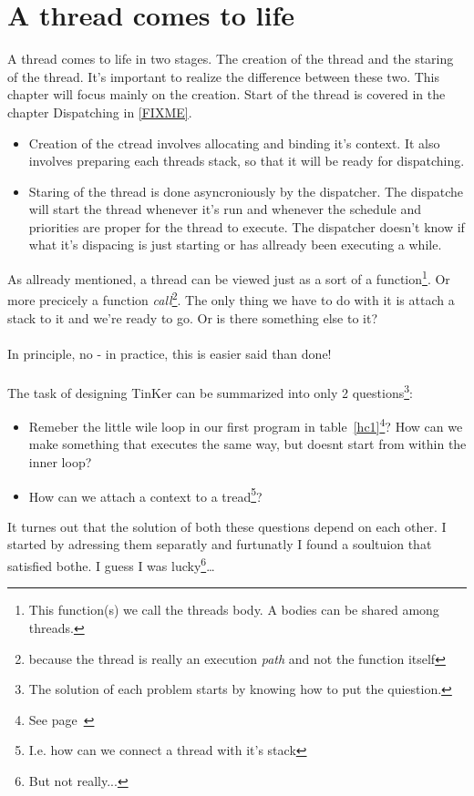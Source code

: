 \chapter{A thread comes to life}{
A thread comes to life in two stages. The creation of the thread and the staring of the thread. It's important to realize the difference between these two. This chapter will focus mainly on the creation. Start of the thread is covered in the chapter Dispatching in \ref{FIXME}.

\begin{itemize}
	\item Creation of the ctread involves allocating and binding it's context. It also involves preparing each threads stack, so that it will be ready for dispatching.
	\item Staring of the thread is done asyncroniously by the dispatcher. The dispatche will start the thread whenever it's run and whenever the schedule and priorities are proper for the thread to execute. The dispatcher doesn't know if what it's dispacing is just starting or has allready been executing a while.
\end{itemize}

As allready mentioned, a thread can be viewed just as a sort of a function\footnote{This function(s) we call the threads body. A bodies can be shared among threads.}. Or more precicely a function \textit{call}\footnote{because the thread is really an execution \textit{path} and not the function itself}. The only thing we have to do with it is attach a stack to it and we're ready to go. Or is there something else to it?
\\\\In principle, no - in practice, this is easier said than done!
\\\\The task of designing TinKer can be summarized into only 2 questions\footnote{The solution of each problem starts by knowing how to put the quiestion.}:
\begin{itemize}
	\item Remeber the little wile loop in our first program in table~\ref{hc1}\footnote{See page~\pageref{hc1} }? How can we make something that executes the same way, but doesnt start from within the inner loop?
	\item How can we attach a context to a tread\footnote{I.e. how can we connect a thread with it's stack}?
\end{itemize}
It turnes out that the solution of both these questions depend on each other. I started by adressing them separatly and furtunatly I found a soultuion that satisfied bothe. I guess I was lucky\footnote{But not really...}\ldots


}
